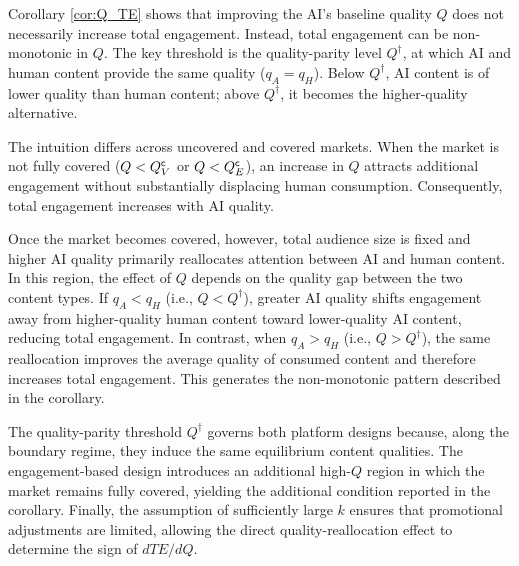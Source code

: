 Corollary \ref{cor:Q_TE} shows that improving the AI's baseline quality $Q$ does not necessarily increase total engagement. Instead, total engagement can be non-monotonic in $Q$. The key threshold is the quality-parity level $Q^{\dagger}$, at which AI and human content provide the same quality ($q_A=q_H$). Below $Q^{\dagger}$, AI content is of lower quality than human content; above $Q^{\dagger}$, it becomes the higher-quality alternative.

The intuition differs across uncovered and covered markets. When the market is not fully covered ($Q<Q^{\sf c}_V$ or $Q<Q^{\sf c}_E$), an increase in $Q$ attracts additional engagement without substantially displacing human consumption. Consequently, total engagement increases with AI quality.

Once the market becomes covered, however, total audience size is fixed and higher AI quality primarily reallocates attention between AI and human content. In this region, the effect of $Q$ depends on the quality gap between the two content types. If $q_A<q_H$ (i.e., $Q<Q^{\dagger}$), greater AI quality shifts engagement away from higher-quality human content toward lower-quality AI content, reducing total engagement. In contrast, when $q_A>q_H$ (i.e., $Q>Q^{\dagger}$), the same reallocation improves the average quality of consumed content and therefore increases total engagement. This generates the non-monotonic pattern described in the corollary.

The quality-parity threshold $Q^{\dagger}$ governs both platform designs because, along the boundary regime, they induce the same equilibrium content qualities. The engagement-based design introduces an additional high-$Q$ region in which the market remains fully covered, yielding the additional condition reported in the corollary. Finally, the assumption of sufficiently large $k$ ensures that promotional adjustments are limited, allowing the direct quality-reallocation effect to determine the sign of $dTE/dQ$.



